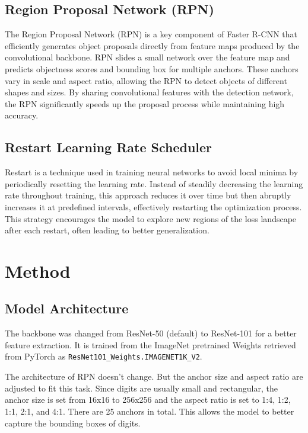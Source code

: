 \documentclass[10pt,twocolumn,letterpaper]{article}
\begin{document}
\subsection{Region Proposal Network (RPN)}
The Region Proposal Network (RPN) is a key component of Faster R-CNN that
efficiently generates object proposals directly from feature maps produced
by the convolutional backbone. RPN slides a small network over the feature
map and predicts objectness scores and bounding box for multiple anchors.
These anchors vary in scale and aspect ratio, allowing the RPN to detect
objects of different shapes and sizes. By sharing convolutional features
with the detection network, the RPN significantly speeds up the proposal
process while maintaining high accuracy.

\subsection{Restart Learning Rate Scheduler}

Restart is a technique used in training neural networks to avoid local
minima by periodically resetting the learning rate. Instead of steadily
decreasing the learning rate throughout training, this approach reduces
it over time but then abruptly increases it at predefined intervals,
effectively restarting the optimization process. This strategy encourages
the model to explore new regions of the loss landscape after each restart,
often leading to better generalization.


\section{Method}
\label{sec:method}

\subsection{Model Architecture}

The backbone was changed from ResNet-50 (default) to ResNet-101 for a better
feature extraction. It is trained from the ImageNet pretrained Weights retrieved
from PyTorch as \verb'ResNet101_Weights.IMAGENET1K_V2'. 

The architecture of RPN doesn't change. But the anchor size and aspect ratio
are adjusted to fit this task. Since digits are usually small and rectangular,
the anchor size is set from 16x16 to 256x256 and the aspect ratio is set to
1:4, 1:2, 1:1, 2:1, and 4:1. There are 25 anchors in total. This allows the
model to better capture the bounding boxes of digits.~\cite{TorchVision}
\end{document}
